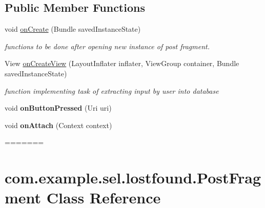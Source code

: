 \subsection*{Public Member Functions}
\begin{DoxyCompactItemize}
\item 
\hypertarget{classcom_1_1example_1_1sel_1_1lostfound_1_1PostFragment_a6ae53f1d4250edd39b3fab572b34a03c}{void \hyperlink{classcom_1_1example_1_1sel_1_1lostfound_1_1PostFragment_a6ae53f1d4250edd39b3fab572b34a03c}{on\-Create} (Bundle saved\-Instance\-State)}\label{classcom_1_1example_1_1sel_1_1lostfound_1_1PostFragment_a6ae53f1d4250edd39b3fab572b34a03c}

\begin{DoxyCompactList}\small\item\em functions to be done after opening new instance of post fragment. \end{DoxyCompactList}\item 
View \hyperlink{classcom_1_1example_1_1sel_1_1lostfound_1_1PostFragment_a8c10184073835d28affa07720db256a4}{on\-Create\-View} (Layout\-Inflater inflater, View\-Group container, Bundle saved\-Instance\-State)
\begin{DoxyCompactList}\small\item\em function implementing task of extracting input by user into database \end{DoxyCompactList}\item 
\hypertarget{classcom_1_1example_1_1sel_1_1lostfound_1_1PostFragment_afba287683734ca9acaea52278c3e1eb5}{void {\bfseries on\-Button\-Pressed} (Uri uri)}\label{classcom_1_1example_1_1sel_1_1lostfound_1_1PostFragment_afba287683734ca9acaea52278c3e1eb5}

\item 
\hypertarget{classcom_1_1example_1_1sel_1_1lostfound_1_1PostFragment_af8646c233bb3c70dbb6352f8a1c60e62}{void {\bfseries on\-Attach} (Context context)}\label{classcom_1_1example_1_1sel_1_1lostfound_1_1PostFragment_af8646c233bb3c70dbb6352f8a1c60e62}
=======
\hypertarget{classcom_1_1example_1_1sel_1_1lostfound_1_1PostFragment}{\section{com.\-example.\-sel.\-lostfound.\-Post\-Fragment \-Class \-Reference}
\label{classcom_1_1example_1_1sel_1_1lostfound_1_1PostFragment}
}



\end{DoxyCompactItemize}
